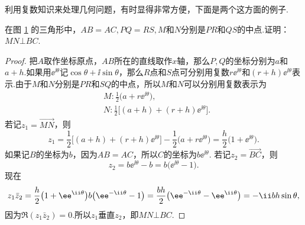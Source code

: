利用复数知识来处理几何问题，有时显得非常方便，下面是两个这方面的例子.
\begin{example}
  在图 \ref{fig1.3} 的三角形中，$AB=AC,PQ=RS,M$和$N$分别是$PR$和$QS$的中点.证明： $MN\bot BC$.
\end{example}
\begin{figure}[!ht]
  \centering
  \caption{}\label{fig1.3}
\end{figure}
\begin{proof}
把$A$取作坐标原点，$AB$所在的直线取作$x$轴，那么$P,Q$的坐标分别为$a$和$a+h$.如果用$\ee^{\ii\theta} $记$\cos\theta+\ii\sin\theta$，那么$R$点和$S$点可分别用复数$r\ee^{\ii\theta}$和$(r+h)\ee^{\ii\theta}$表示.由于$M$和$N$分别是$PR$和$SQ$的中点，所以$M$和$N$可以分别用复数表示为
\begin{align*}
  & M: \frac12 \big( a + r\ee^{\ii\theta} \big),\\
  & N: \frac12 \big[ (a + h) + (r + h)\ee^{\ii\theta} \big].
\end{align*}
若记$z_1=\overrightarrow{MN}$，则
\[
  z_1 = \frac12 \big[ (a + h) + (r + h)\ee^{\ii\theta} \big] - \frac12 \big( a + r\ee^{\ii\theta} \big) =
  \frac h2 \big( 1 + \ee^{\ii\theta} \big).
\]
如果记$B$的坐标为$b$，因为$AB=AC$，所以$C$的坐标为$b\ee^{\ii\theta}$. 若记$z_2=\overrightarrow{BC}$，则
\[
  z_2 = b\ee^{\ii\theta} - b = b\big( \ee^{\ii\theta} - 1 \big).
\]
现在
\[
  z_1\bar z_2 = \frac h2 \big( 1 + \ee^{\ii\theta} \big)b \big( \ee^{-\ii\theta} - 1 \big)\\
  = \frac{bh}2 \big( \ee^{-\ii\theta} - \ee^{\ii\theta} \big) = -\ii bh\sin\theta,
\]
因为$\Re(z_1\bar z_2)=0$.所以$z_1$垂直$z_2$，即$MN\bot BC$.
\end{proof}

